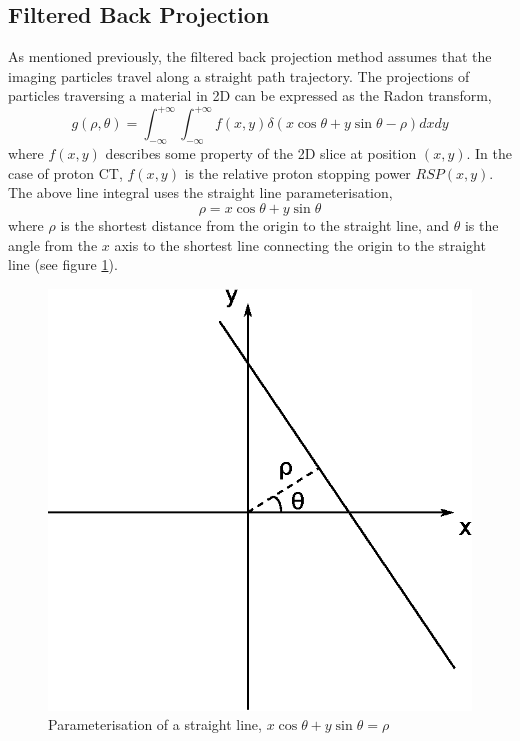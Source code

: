 \documentclass[11pt,a4paper]{article}
\begin{document}
\subsection{Filtered Back Projection}
\label{sec:fbp}
As mentioned previously, the filtered back projection method assumes that the imaging particles travel along a straight path trajectory. The projections of particles traversing a material in 2D can be expressed as the Radon transform,
\begin{equation}
g(\rho, \theta) = \int_{-\infty}^{+\infty} \int_{-\infty}^{+\infty} f(x,y) \delta(x \cos \theta + y \sin \theta - \rho) dx dy
\label{radon}
\end{equation}
where $f(x,y)$ describes some property of the 2D slice at position $(x,y)$. In the case of proton CT, $f(x,y)$ is the relative proton stopping power $RSP(x,y)$. The above line integral uses the straight line parameterisation, 
\begin{equation}
\rho = x \cos\theta + y \sin \theta
\end{equation}
where $\rho$ is the shortest distance from the origin to the straight line, and $\theta$ is the angle from the $x$ axis to the shortest line connecting the origin to the straight line (see figure \ref{param}). 
\begin{figure}[h]
\centering
\includegraphics[scale=0.6]{img/param.eps}
\caption{Parameterisation of a straight line, $x \cos \theta + y \sin \theta = \rho$}
\label{param}
\end{figure}
\end{document}
